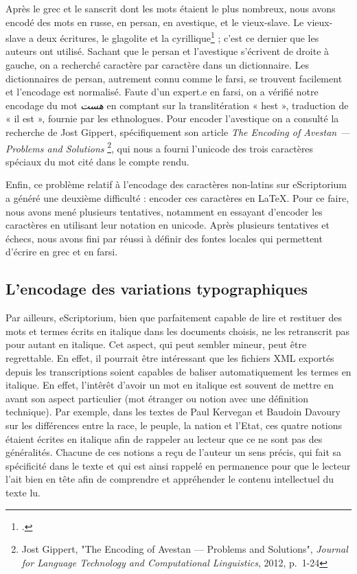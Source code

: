 \documentclass{article}
\begin{document}
	Après le grec et le sanscrit dont les mots étaient le plus nombreux, nous avons encodé des mots en russe, en persan, en avestique, et le vieux-slave. Le vieux-slave a deux écritures, le glagolite et la cyrillique\footcite{vaillantAlphabetVieuxslave1955} ; c'est ce dernier que les auteurs ont utilisé. Sachant que le persan et l’avestique s’écrivent de droite à gauche, on a recherché caractère par caractère dans un dictionnaire. Les dictionnaires de persan, autrement connu comme le farsi, se trouvent facilement et l’encodage est normalisé. Faute d’un expert.e en farsi, on a vérifié notre encodage du mot \textit{{\farsi هست}} en comptant sur la translitération « hest », traduction de « il est », fournie par les ethnologues. Pour encoder l’avestique on a consulté la recherche de Jost Gippert, spécifiquement son article \textit{The Encoding of Avestan — Problems and Solutions} \footnote{Jost Gippert, "The Encoding of Avestan — Problems and Solutions", \textit{Journal for Language Technology and Computational Linguistics}, 2012, p.~1-24}, qui nous a fourni l’unicode des trois caractères spéciaux du mot cité dans le compte rendu.
	
	Enfin, ce problème relatif à l'encodage des caractères non-latins sur eScriptorium a généré une deuxième difficulté : encoder ces caractères en \LaTeX. Pour ce faire, nous avons mené plusieurs tentatives, notamment en essayant d'encoder les caractères en utilisant leur notation en unicode. Après plusieurs tentatives et échecs, nous avons fini par réussi à définir des fontes locales qui permettent d'écrire en grec et en farsi.
	
	\subsection{L'encodage des variations typographiques}
	
	Par ailleurs, eScriptorium, bien que parfaitement capable de lire et restituer des mots et termes écrits en italique dans les documents choisis, ne les retranscrit pas pour autant en italique. Cet aspect, qui peut sembler mineur, peut être regrettable. En effet, il pourrait être intéressant que les fichiers XML exportés depuis les transcriptions soient capables de baliser automatiquement les termes en italique. En effet, l'intêrêt d'avoir un mot en italique est souvent de mettre en avant son aspect particulier (mot étranger ou notion avec une définition technique). Par exemple, dans les textes de Paul Kervegan et Baudoin Davoury sur les différences entre la race, le peuple, la nation et l'Etat, ces quatre notions étaient écrites en italique afin de rappeler au lecteur que ce ne sont pas des généralités. Chacune de ces notions a reçu de l'auteur un sens précis, qui fait sa spécificité dans le texte et qui est ainsi rappelé en permanence pour que le lecteur l'ait bien en tête afin de comprendre et appréhender le contenu intellectuel du texte lu.
	
	\pagebreak
	\printbibliography[title=Bibliographie]
	
	\pagebreak
	\tableofcontents
\end{document}

